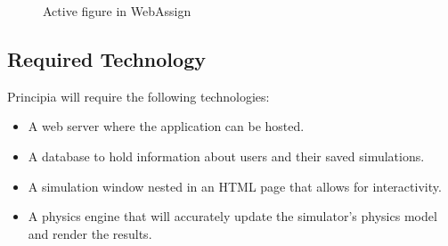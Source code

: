 \begin{figure}[H]
	\centering
    \caption{Active figure in WebAssign \cite{WebAssign}}
\end{figure}



\clearpage
\BgThispage
\subsection{Required Technology}

\noindent
Principia will require the following technologies:
\begin{itemize}
\item A web server where the application can be hosted.
\item A database to hold information about users and their saved simulations.
\item A simulation window nested in an HTML page that allows for interactivity.
\item A physics engine that will accurately update the simulator's physics model and render the results.
\end{itemize}

